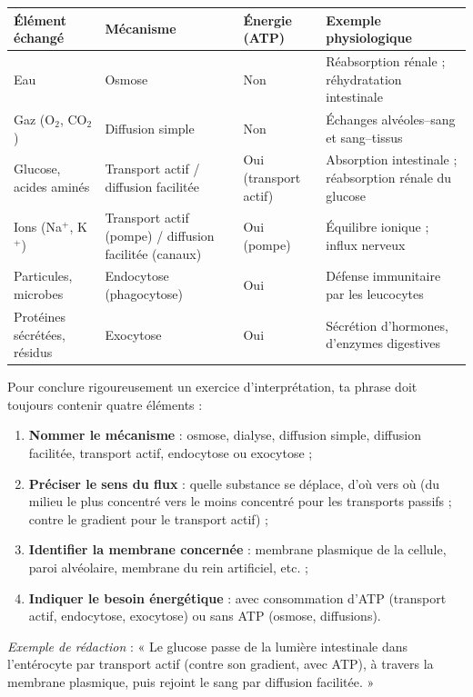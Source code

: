 \documentclass[11pt]{article}
\begin{document}
\begin{center}
\begin{tabularx}{\linewidth}{|l|X|X|X|}
\hline
\rowcolor{popblueL}
\textbf{Élément échangé} & \textbf{Mécanisme} & \textbf{Énergie (ATP)} & \textbf{Exemple physiologique} \\
\hline
Eau & Osmose & Non & Réabsorption rénale ; réhydratation intestinale \\
\hline
Gaz (O$_2$, CO$_2$) & Diffusion simple & Non & Échanges alvéoles--sang et sang--tissus \\
\hline
Glucose, acides aminés & Transport actif / diffusion facilitée & Oui (transport actif) & Absorption intestinale ; réabsorption rénale du glucose \\
\hline
Ions (Na$^+$, K$^+$) & Transport actif (pompe) / diffusion facilitée (canaux) & Oui (pompe) & Équilibre ionique ; influx nerveux \\
\hline
Particules, microbes & Endocytose (phagocytose) & Oui & Défense immunitaire par les leucocytes \\
\hline
Protéines sécrétées, résidus & Exocytose & Oui & Sécrétion d'hormones, d'enzymes digestives \\
\hline
\end{tabularx}
\end{center}

\begin{methode}
Pour conclure rigoureusement un exercice d'interprétation, ta phrase doit toujours contenir quatre éléments :
\begin{enumerate}
\item \textbf{Nommer le mécanisme} : osmose, dialyse, diffusion simple, diffusion facilitée, transport actif, endocytose ou exocytose ;
\item \textbf{Préciser le sens du flux} : quelle substance se déplace, d'où vers où (du milieu le plus concentré vers le moins concentré pour les transports passifs ; contre le gradient pour le transport actif) ;
\item \textbf{Identifier la membrane concernée} : membrane plasmique de la cellule, paroi alvéolaire, membrane du rein artificiel, etc. ;
\item \textbf{Indiquer le besoin énergétique} : avec consommation d'ATP (transport actif, endocytose, exocytose) ou sans ATP (osmose, diffusions).
\end{enumerate}
\emph{Exemple de rédaction} : « Le glucose passe de la lumière intestinale dans l'entérocyte par transport actif (contre son gradient, avec ATP), à travers la membrane plasmique, puis rejoint le sang par diffusion facilitée. »
\end{methode}
\end{document}
